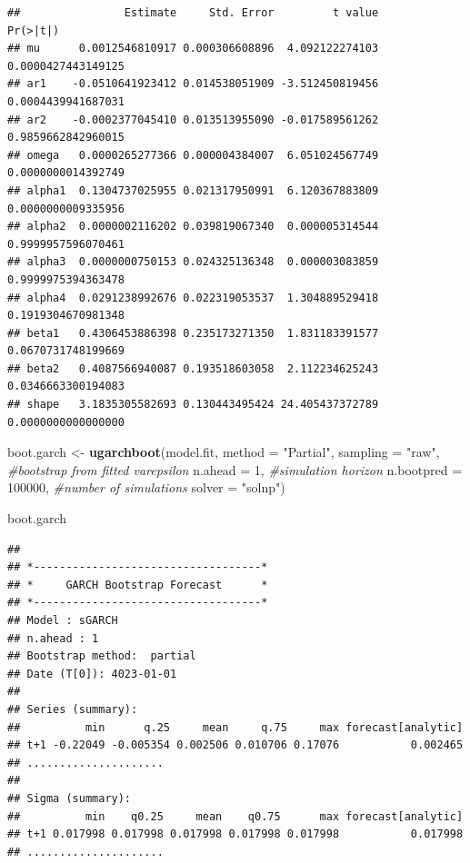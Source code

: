 \documentclass[
]{book}
\newenvironment{Shaded}{\begin{snugshade}}{\end{snugshade}}
\newcommand{\AttributeTok}[1]{\textcolor[rgb]{0.13,0.29,0.53}{#1}}
\newcommand{\CommentTok}[1]{\textcolor[rgb]{0.56,0.35,0.01}{\textit{#1}}}
\newcommand{\DecValTok}[1]{\textcolor[rgb]{0.00,0.00,0.81}{#1}}
\newcommand{\FunctionTok}[1]{\textcolor[rgb]{0.13,0.29,0.53}{\textbf{#1}}}
\newcommand{\NormalTok}[1]{#1}
\newcommand{\OtherTok}[1]{\textcolor[rgb]{0.56,0.35,0.01}{#1}}
\newcommand{\StringTok}[1]{\textcolor[rgb]{0.31,0.60,0.02}{#1}}
\begin{document}
\begin{verbatim}
##                Estimate     Std. Error         t value           Pr(>|t|)
## mu      0.0012546810917 0.000306608896  4.092122274103 0.0000427443149125
## ar1    -0.0510641923412 0.014538051909 -3.512450819456 0.0004439941687031
## ar2    -0.0002377045410 0.013513955090 -0.017589561262 0.9859662842960015
## omega   0.0000265277366 0.000004384007  6.051024567749 0.0000000014392749
## alpha1  0.1304737025955 0.021317950991  6.120367883809 0.0000000009335956
## alpha2  0.0000002116202 0.039819067340  0.000005314544 0.9999957596070461
## alpha3  0.0000000750153 0.024325136348  0.000003083859 0.9999975394363478
## alpha4  0.0291238992676 0.022319053537  1.304889529418 0.1919304670981348
## beta1   0.4306453886398 0.235173271350  1.831183391577 0.0670731748199669
## beta2   0.4087566940087 0.193518603058  2.112234625243 0.0346663300194083
## shape   3.1835305582693 0.130443495424 24.405437372789 0.0000000000000000
\end{verbatim}

\begin{Shaded}
\begin{Highlighting}[]
\NormalTok{boot.garch }\OtherTok{\textless{}{-}} \FunctionTok{ugarchboot}\NormalTok{(model.fit,}
                         \AttributeTok{method =} \StringTok{"Partial"}\NormalTok{,}
                         \AttributeTok{sampling =} \StringTok{"raw"}\NormalTok{,  }\CommentTok{\#bootstrap from fitted varepsilon}
                         \AttributeTok{n.ahead =} \DecValTok{1}\NormalTok{,          }\CommentTok{\#simulation horizon}
                         \AttributeTok{n.bootpred =} \DecValTok{100000}\NormalTok{, }\CommentTok{\#number of simulations }
                         \AttributeTok{solver =} \StringTok{"solnp"}\NormalTok{)}

\NormalTok{boot.garch}
\end{Highlighting}
\end{Shaded}

\begin{verbatim}
## 
## *-----------------------------------*
## *     GARCH Bootstrap Forecast      *
## *-----------------------------------*
## Model : sGARCH
## n.ahead : 1
## Bootstrap method:  partial
## Date (T[0]): 4023-01-01
## 
## Series (summary):
##          min      q.25     mean     q.75     max forecast[analytic]
## t+1 -0.22049 -0.005354 0.002506 0.010706 0.17076           0.002465
## .....................
## 
## Sigma (summary):
##          min    q0.25     mean    q0.75      max forecast[analytic]
## t+1 0.017998 0.017998 0.017998 0.017998 0.017998           0.017998
## .....................
\end{verbatim}
\end{document}
